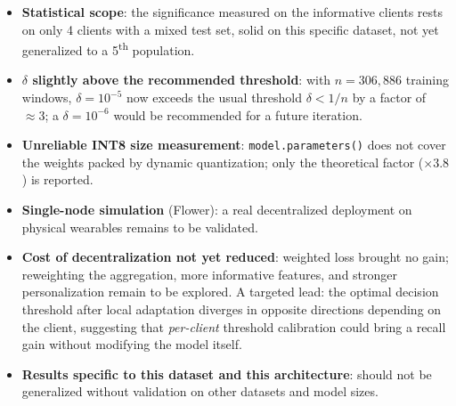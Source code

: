 \documentclass{acmart}
\begin{document}
\begin{itemize}
\item \textbf{Statistical scope}: the significance measured on the informative
clients rests on only 4 clients with a mixed test set, solid on this specific
dataset, not yet generalized to a 5\textsuperscript{th} population.
\item \textbf{$\delta$ slightly above the recommended threshold}: with
$n=306{,}886$ training windows, $\delta=10^{-5}$ now exceeds the usual threshold
$\delta<1/n$ by a factor of $\approx3$; a $\delta=10^{-6}$ would be recommended for a
future iteration.
\item \textbf{Unreliable INT8 size measurement}: \texttt{model.parameters()} does not
cover the weights packed by dynamic quantization; only the theoretical factor
($\times3.8$) is reported.
\item \textbf{Single-node simulation} (Flower): a real decentralized deployment on
physical wearables remains to be validated.
\item \textbf{Cost of decentralization not yet reduced}: weighted loss brought no
gain; reweighting the aggregation, more informative features, and stronger
personalization remain to be explored. A targeted lead: the optimal decision
threshold after local adaptation diverges in opposite directions depending on the
client, suggesting that \emph{per-client} threshold calibration could bring a recall
gain without modifying the model itself.
\item \textbf{Results specific to this dataset and this architecture}: should not be
generalized without validation on other datasets and model sizes.
\end{itemize}

\bigskip
{}

\printbibliography
\end{document}
